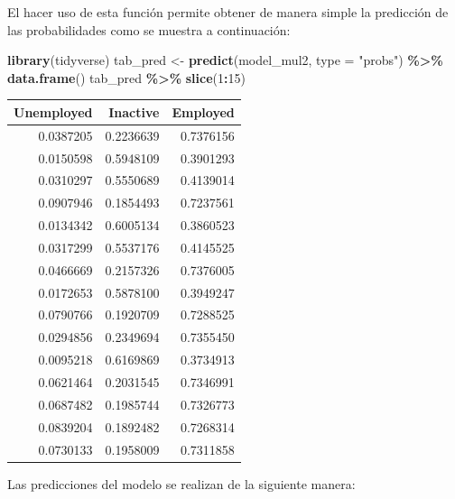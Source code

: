 \documentclass[
  spanish,
  12pt,
]{book}
\newenvironment{Shaded}{\begin{snugshade}}{\end{snugshade}}
\newcommand{\AttributeTok}[1]{\textcolor[rgb]{0.13,0.29,0.53}{#1}}
\newcommand{\DecValTok}[1]{\textcolor[rgb]{0.00,0.00,0.81}{#1}}
\newcommand{\FunctionTok}[1]{\textcolor[rgb]{0.13,0.29,0.53}{\textbf{#1}}}
\newcommand{\NormalTok}[1]{#1}
\newcommand{\OtherTok}[1]{\textcolor[rgb]{0.56,0.35,0.01}{#1}}
\newcommand{\SpecialCharTok}[1]{\textcolor[rgb]{0.81,0.36,0.00}{\textbf{#1}}}
\newcommand{\StringTok}[1]{\textcolor[rgb]{0.31,0.60,0.02}{#1}}
\begin{document}
El hacer uso de esta función permite obtener de manera simple la predicción de las probabilidades como se muestra a continuación:

\begin{Shaded}
\begin{Highlighting}[]
\FunctionTok{library}\NormalTok{(tidyverse)}
\NormalTok{tab\_pred }\OtherTok{\textless{}{-}} \FunctionTok{predict}\NormalTok{(model\_mul2, }\AttributeTok{type =} \StringTok{"probs"}\NormalTok{) }\SpecialCharTok{\%\textgreater{}\%} 
  \FunctionTok{data.frame}\NormalTok{()}
\NormalTok{tab\_pred }\SpecialCharTok{\%\textgreater{}\%} \FunctionTok{slice}\NormalTok{(}\DecValTok{1}\SpecialCharTok{:}\DecValTok{15}\NormalTok{)}
\end{Highlighting}
\end{Shaded}

\begin{tabular}{r|r|r}
\hline
Unemployed & Inactive & Employed\\
\hline
0.0387205 & 0.2236639 & 0.7376156\\
\hline
0.0150598 & 0.5948109 & 0.3901293\\
\hline
0.0310297 & 0.5550689 & 0.4139014\\
\hline
0.0907946 & 0.1854493 & 0.7237561\\
\hline
0.0134342 & 0.6005134 & 0.3860523\\
\hline
0.0317299 & 0.5537176 & 0.4145525\\
\hline
0.0466669 & 0.2157326 & 0.7376005\\
\hline
0.0172653 & 0.5878100 & 0.3949247\\
\hline
0.0790766 & 0.1920709 & 0.7288525\\
\hline
0.0294856 & 0.2349694 & 0.7355450\\
\hline
0.0095218 & 0.6169869 & 0.3734913\\
\hline
0.0621464 & 0.2031545 & 0.7346991\\
\hline
0.0687482 & 0.1985744 & 0.7326773\\
\hline
0.0839204 & 0.1892482 & 0.7268314\\
\hline
0.0730133 & 0.1958009 & 0.7311858\\
\hline
\end{tabular}

Las predicciones del modelo se realizan de la siguiente manera:

\begin{Shaded}
\end{Shaded}
\end{document}

